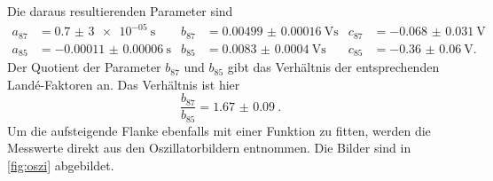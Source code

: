 Die daraus resultierenden Parameter sind
\begin{align*}
    a_\text{87} &= \qty{0.7(30)e-05}{\second} & b_{87} &= \qty{0.00499(16)}{\volt\second} &  c_{87} &= \qty{-0.068(31)}{\volt}\\
    a_\text{85} &= \qty{-0.00011(6)}{\second} & b_{85} &= \qty{0.0083(4)}{\volt\second} &  c_{85} &= \qty{-0.36(6)}{\volt}.
\end{align*}
Der Quotient der Parameter $b_{87}$ und $b_{85}$ gibt das Verhältnis der entsprechenden Landé-Faktoren an.
Das Verhältnis ist hier
\begin{equation*}
    \frac{b_{87}}{b_{85}} = \qty{1.67(9)}{}.
\end{equation*}
Um die aufsteigende Flanke ebenfalls mit einer Funktion zu fitten, werden die Messwerte direkt aus den Oszillatorbildern entnommen.
Die Bilder sind in \autoref{fig:oszi} abgebildet.
